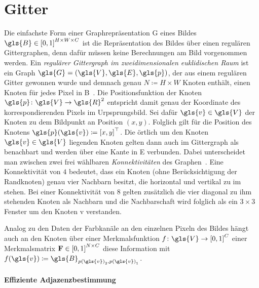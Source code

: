 \section{Gitter}
\label{gitter}

Die einfachste Form einer Graphrepräsentation \gls{G} eines Bildes $\gls{B} \in {\left[0,1\right]}^{H \times W \times C}$ ist die Repräsentation des Bildes über einen regulären Gittergraphen, denn dafür müssen keine Berechnungen am Bild vorgenommen werden.
Ein \emph{regulärer Gittergraph im zweidimensionalen euklidischen Raum} ist ein Graph $\gls{G} = \left(\gls{V}, \gls{E}, \gls{p}\right)$, der aus einem regulären Gitter gewonnen wurde und demnach genau $N \coloneqq H \times W$ Knoten enthält, \dhe{} einen Knoten für jedes Pixel in \gls{B}~\cite{Defferrard}.
Die Positionsfunktion der Knoten $\gls{p} \colon \gls{V} \to \gls{R}^2$ entspricht damit genau der Koordinate des korrespondierenden Pixels im Urpsprungsbild.
Sei dafür $\gls{v} \in \gls{V}$ der Knoten zu dem Bildpunkt an Position $\left(x,y\right)$.
Folglich gilt für die Position des Knotens $\gls{p}\left(\gls{v}\right) \coloneqq {\left[x,y\right]}^{\top}$.
Die örtlich um den Knoten $\gls{v} \in \gls{V}$ liegenden Knoten gelten dann auch im Gittergraph als benachbart und werden über eine Kante in \gls{E} verbunden.
Dabei unterscheidet man zwischen zwei frei wählbaren \emph{Konnektivitäten} des Graphen~\cite{Defferrard}.
Eine Konnektivität von $4$ bedeutet, dass ein Knoten (ohne Berücksichtigung der Randknoten) genau vier Nachbarn besitzt, die horizontal und vertikal zu im stehen.
Bei einer Konnektivität von $8$ gelten zusätzlich die vier diagonal zu ihm stehenden Knoten als Nachbarn und die Nachbarschaft wird folglich als ein $3 \times 3$ Fenster um den Knoten \gls{v} verstanden.

Analog zu den Daten der Farbkanäle an den einzelnen Pixeln des Bildes hängt auch an den Knoten über einer Merkmalsfunktion $f \colon \gls{V} \to {\left[0,1\right]}^C$ \bzw{} einer Merkmalsmatrix $\ma{F} \in {\left[0,1\right]}^{N \times C}$ diese Information mit $f\left(\gls{v}\right) \coloneqq \gls{B}_{{p\left(\gls{v}\right)}_2,{p\left(\gls{v}\right)}_1}$.

\paragraph{Effiziente Adjazenzbestimmung}
\label{adjazenzbestimmung_gitter}


